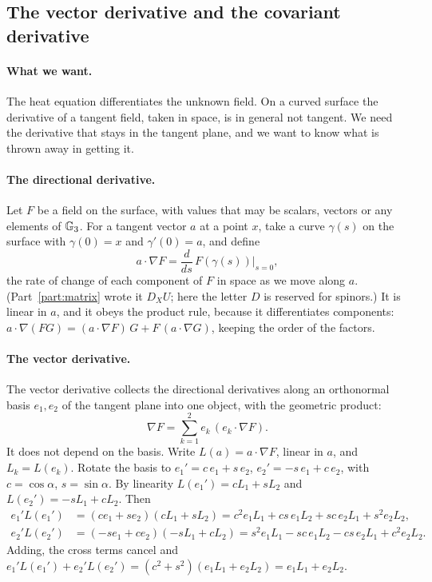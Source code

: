 \subsection{The vector derivative and the covariant derivative}
\label{section:r2_covariant}

\paragraph{What we want.} The heat equation differentiates the unknown field. On a curved surface the derivative of a tangent field, taken in space, is in general not tangent. We need the derivative that stays in the tangent plane, and we want to know what is thrown away in getting it.

\paragraph{The directional derivative.} Let $F$ be a field on the surface, with values that may be scalars, vectors or any elements of $\mathbb{G}_3$. For a tangent vector $a$ at a point $x$, take a curve $\gamma(s)$ on the surface with $\gamma(0) = x$ and $\gamma'(0) = a$, and define
\begin{equation*}
a\cdot\nabla F = \frac{d}{ds}\, F(\gamma(s))\Big|_{s = 0} ,
\end{equation*}
the rate of change of each component of $F$ in space as we move along $a$. (Part~\ref{part:matrix} wrote it $D_X U$; here the letter $D$ is reserved for spinors.) It is linear in $a$, and it obeys the product rule, because it differentiates components: $a\cdot\nabla(FG) = (a\cdot\nabla F)\,G + F\,(a\cdot\nabla G)$, keeping the order of the factors.

\paragraph{The vector derivative.} The vector derivative collects the directional derivatives along an orthonormal basis $e_1, e_2$ of the tangent plane into one object, with the geometric product:
\begin{equation}
\label{eqn:r2_vector_derivative}
\nabla F = \sum_{k=1}^2 e_k\, (e_k\cdot\nabla F) .
\end{equation}
It does not depend on the basis. Write $L(a) = a\cdot\nabla F$, linear in $a$, and $L_k = L(e_k)$. Rotate the basis to $e_1' = c\, e_1 + s\, e_2$, $e_2' = -s\, e_1 + c\, e_2$, with $c = \cos\alpha$, $s = \sin\alpha$. By linearity $L(e_1') = cL_1 + sL_2$ and $L(e_2') = -sL_1 + cL_2$. Then
\begin{align*}
e_1' L(e_1') &= (c e_1 + s e_2)(c L_1 + s L_2) = c^2 e_1L_1 + cs\, e_1L_2 + sc\, e_2L_1 + s^2 e_2L_2 , \\
e_2' L(e_2') &= (-s e_1 + c e_2)(-s L_1 + c L_2) = s^2 e_1L_1 - sc\, e_1L_2 - cs\, e_2L_1 + c^2 e_2L_2 .
\end{align*}
Adding, the cross terms cancel and $e_1'L(e_1') + e_2'L(e_2') = (c^2 + s^2)(e_1L_1 + e_2L_2) = e_1L_1 + e_2L_2$.

